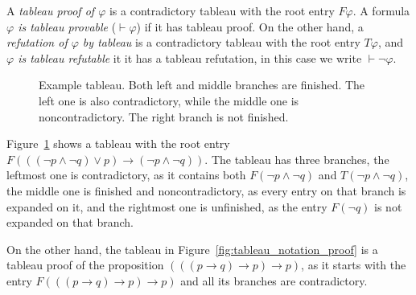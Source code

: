 A \emph{tableau proof of $\varphi$} is a contradictory tableau with the root entry $F \varphi$. A formula \emph{$\varphi$ is tableau provable} ($\vdash \varphi$) if it has tableau proof. On the other hand, a \emph{refutation of $\varphi$ by tableau} is a contradictory tableau with the root entry $T \varphi$, and \emph{$\varphi$ is tableau refutable} it it has a tableau refutation, in this case we write $\vdash \neg \varphi$.


\begin{figure}
\centering
{}
\caption{Example tableau. Both left and middle branches are finished. The left one is also contradictory, while the middle one is noncontradictory. The right branch is not finished.}
\label{fig:tableau_example}
\end{figure}

Figure~\ref{fig:tableau_example} shows a tableau with the root entry $F(((\neg p \land \neg q) \lor p) \to (\neg p \land \neg q))$. The tableau has three branches, the leftmost one is contradictory, as it contains both $F (\neg p \land \neg q)$ and $T (\neg p \land \neg q)$, the middle one is finished and noncontradictory, as every entry on that branch is expanded on it, and the rightmost one is unfinished, as the entry $F (\neg q)$ is not expanded on that branch.

On the other hand, the tableau in Figure~\ref{fig:tableau_notation_proof} is a tableau proof of the proposition $(((p \to q) \to p) \to p)$, as it starts with the entry $F(((p \to q) \to p) \to p)$ and all its branches are contradictory.

